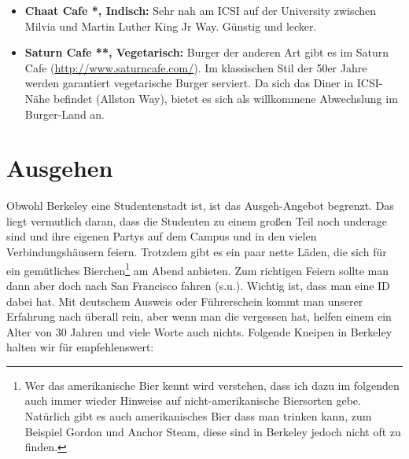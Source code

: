 \documentclass[a4paper]{scrreprt}
\begin{document}
\begin{itemize}
  \item \textbf{Chaat Cafe *, Indisch:} Sehr nah am ICSI auf der University zwischen Milvia und Martin Luther King Jr Way. Günstig und lecker.   
  
  \item \textbf{Saturn Cafe **, Vegetarisch:} Burger der anderen Art gibt es im Saturn Cafe (\url{http://www.saturncafe.com/}). Im klassischen Stil der 50er Jahre werden garantiert vegetarische Burger serviert. Da sich das Diner in ICSI-Nähe befindet (Allston Way), bietet es sich als willkommene Abwechslung im Burger-Land an.

\end{itemize}

\section{Ausgehen}

Obwohl Berkeley eine Studentenstadt ist, ist das Ausgeh-Angebot begrenzt. Das liegt vermutlich daran, dass die Studenten zu einem großen Teil noch underage sind und ihre eigenen Partys auf dem Campus und in den vielen Verbindungshäusern feiern. Trotzdem gibt es ein paar nette Läden, die sich für ein gemütliches Bierchen\footnote{Wer das amerikanische Bier kennt wird verstehen, dass ich dazu im folgenden auch immer wieder Hinweise auf nicht-amerikanische Biersorten gebe. Natürlich gibt es auch amerikanisches Bier dass man trinken kann, zum Beispiel Gordon und Anchor Steam, diese sind in Berkeley jedoch nicht oft zu finden.} am Abend anbieten.  Zum richtigen Feiern sollte man dann aber doch nach San Francisco fahren (s.u.). Wichtig ist, dass man eine ID dabei hat. Mit deutschem Ausweis oder Führerschein kommt man unserer Erfahrung nach überall rein, aber wenn man die vergessen hat, helfen einem ein Alter von 30 Jahren und viele Worte auch nichts. Folgende Kneipen in Berkeley halten wir für empfehlenswert:
\end{document}
